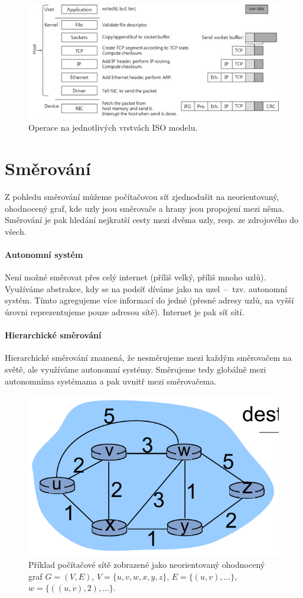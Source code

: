 \begin{figure}[H]
    \centering
    \includegraphics[width=1\linewidth]{operation_process_by_each_layer.png}
    \caption{Operace na jednotlivých vrstvách ISO modelu.}
\end{figure}


\section{Směrování}

Z pohledu směrování můžeme počítačovou síť zjednodušit na neorientovaný, ohodnocený graf, kde uzly jsou směrovače a hrany jsou propojení mezi něma. Směrování je pak hledání nejkratší cesty mezi dvěma uzly, resp. ze zdrojového do všech.

\paragraph*{Autonomní systém} Není možné směrovat přes celý internet (příliš velký, příliš mnoho uzlů). Využíváme abstrakce, kdy se na podsíť díváme jako na uzel~--~tzv. autonomní systém. Tímto agregujeme více informací do jedné (přesné adresy uzlů, na vyšší úrovni reprezentujeme pouze adresou sítě). Internet je pak síť sítí.

\paragraph*{Hierarchické směrování} Hierarchické směrování znamená, že nesměrujeme mezi každým směrovačem na světě, ale využíváme autonomní systémy. Směrujeme tedy globálně mezi autonomníma systémama a pak uvnitř mezi směrovačema.

\begin{figure}[H]
    \centering
    \includegraphics[width=0.5\linewidth]{network_abstraction.pdf}
    \caption{Příklad počítačové sítě zobrazené jako neorientovaný ohodnocený graf $G=(V, E)$, $V=\{u, v, w, x, y, z\}$, $E = \{ (u, v), \dots \}$, $w = \{ ((u, v), 2), \dots \}$.}
\end{figure}

